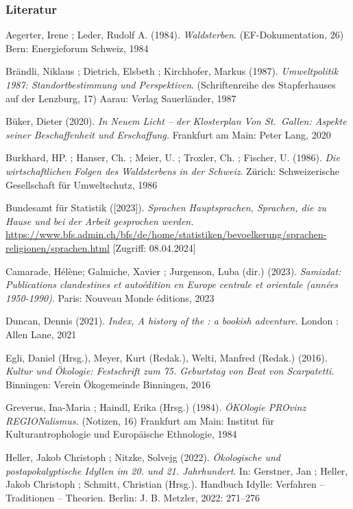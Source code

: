 \documentclass[a4paper,
fontsize=11pt,
oneside,
numbers=noperiodatend,
parskip=half-,
bibliography=totoc,
final
]{scrartcl}
\begin{document}
\subsubsection{Literatur}\label{literatur}

Aegerter, Irene ; Leder, Rudolf A. (1984). \emph{Waldsterben}.
(EF-Dokumentation, 26) Bern: Energieforum Schweiz, 1984

Brändli, Niklaus ; Dietrich, Elsbeth ; Kirchhofer, Markus (1987).
\emph{Umweltpolitik 1987: Standortbestimmung und Perspektiven}.
(Schriftenreihe des Stapferhauses auf der Lenzburg, 17) Aarau: Verlag
Sauerländer, 1987

Büker, Dieter (2020). \emph{In Neuem Licht -- der Klosterplan Von
St.~Gallen: Aspekte seiner Beschaffenheit und Erschaffung.} Frankfurt am
Main: Peter Lang, 2020

Burkhard, HP. ; Hanser, Ch. ; Meier, U. ; Troxler, Ch. ; Fischer, U.
(1986). \emph{Die wirtschaftlichen Folgen des Waldsterbens in der
Schweiz}. Zürich: Schweizerische Gesellschaft für Umweltschutz, 1986

Bundesamt für Statistik ({[}2023{]}). \emph{Sprachen Hauptsprachen,
Sprachen, die zu Hause und bei der Arbeit gesprochen werden.}
\url{https://www.bfs.admin.ch/bfs/de/home/statistiken/bevoelkerung/sprachen-religionen/sprachen.html}
{[}Zugriff: 08.04.2024{]}

Camarade, Hélène; Galmiche, Xavier ; Jurgenson, Luba (dir.) (2023).
\emph{Samizdat: Publications clandestines et autoédition en Europe
centrale et orientale (années 1950-1990)}. Paris: Nouveau Monde
éditions, 2023

Duncan, Dennis (2021). \emph{Index, A history of the : a bookish
adventure}. London : Allen Lane, 2021

Egli, Daniel (Hrsg.), Meyer, Kurt (Redak.), Welti, Manfred (Redak.)
(2016). \emph{Kultur und Ökologie: Festschrift zum 75. Geburtstag von
Beat von Scarpatetti}. Binningen: Verein Ökogemeinde Binningen, 2016

Greverus, Ina-Maria ; Haindl, Erika (Hrsg.) (1984). \emph{ÖKOlogie
PROvinz REGIONalismus.} (Notizen, 16) Frankfurt am Main: Institut für
Kulturantrophologie und Europäische Ethnologie, 1984

Heller, Jakob Christoph ; Nitzke, Solvejg (2022). \emph{Ökologische und
postapokalyptische Idyllen im 20. und 21. Jahrhundert}. In: Gerstner,
Jan ; Heller, Jakob Christoph ; Schmitt, Christian (Hrsg.). Handbuch
Idylle: Verfahren -- Traditionen -- Theorien. Berlin: J. B. Metzler,
2022: 271--276
\end{document}
